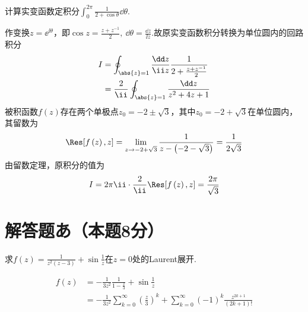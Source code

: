 {\begin{exercise}
    计算实变函数定积分$\int_0^{2\pi}{\frac{1}{2+\cos{\theta}}\dd\theta}$.
\end{exercise}
\begin{solution}
    作变换$z=\ee^{\ii\theta}$，即$\cos{z}=\frac{z+z^{-1}}{2},\ \dd\theta=\frac{\dd z}{\ii z}$.故原实变函数积分转换为单位圆内的回路积分
    $$
    \begin{aligned}
        I&=\oint_{\abs{z}=1}{\frac{\dd z}{\ii z}\frac{1}{2+\frac{z+z^{-1}}{2}}}\\
        &=\frac{2}{\ii}\oint_{\abs{z}=1}\frac{\dd z}{z^2+4z+1}
    \end{aligned}
    $$
    被积函数$f\left(z\right)$存在两个单极点$z_0=-2\pm\sqrt{3}$，其中$z_0=-2+\sqrt{3}$在单位圆内，其留数为
    $$\Res[f\left(z\right),z]=\lim_{z\to -2+\sqrt{3}}\frac{1}{z-\left(-2-\sqrt{3}\right)}=\frac{1}{2\sqrt{3}}$$
    由留数定理，原积分的值为
    $$I=2\pi\ii\cdot\frac{2}{\ii}\Res[f\left(z\right),z]=\frac{2\pi}{\sqrt{3}}$$
\end{solution}
}
\section{解答题あ（本题8分）}
{
    \begin{exercise}
        求$f\left(z\right)=\frac{1}{z^2\left(z-3\right)}+\sin{\frac{1}{z}}$在$z=0$处的Laurent展开.
    \end{exercise}
    \begin{solution}
        $$
        \begin{aligned}
            f\left(z\right)&=-\frac{1}{3z^2}\frac{1}{1-\frac{z}{3}}+\sin{\frac{1}{z}}\\
            &=-\frac{1}{3z^2}\sum_{k=0}^{\infty}{\left(\frac{z}{3}\right)^k}+\sum_{k=0}^{\infty}{\left(-1\right)^k\frac{z^{2k+1}}{\left(2k+1\right)!}}
        \end{aligned}
        $$
    \end{solution}
}
